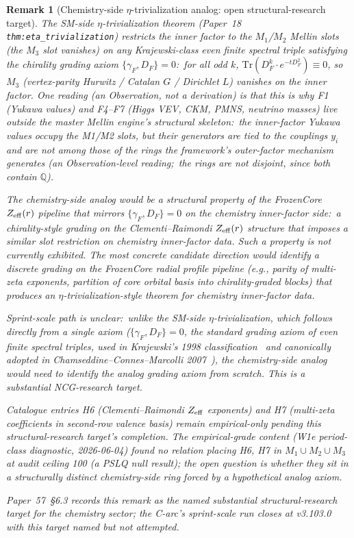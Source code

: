 \documentclass[11pt]{article}
\newtheorem{remark}{Remark}
\begin{document}
\begin{remark}[Chemistry-side $\eta$-trivialization analog: open structural-research target]
\label{rem:chemistry_eta_analog}
The SM-side $\eta$-trivialization theorem (Paper~18 \texttt{thm:eta\_trivialization})
restricts the inner factor to the $M_1$/$M_2$ Mellin \emph{slots} (the
$M_3$ slot vanishes) on any
Krajewski-class even finite spectral triple satisfying the chirality
grading axiom $\{\gamma_F, D_F\} = 0$:\ for all odd $k$, $\mathrm{Tr}(D_F^k
\cdot e^{-tD_F^2}) \equiv 0$, so $M_3$ (vertex-parity Hurwitz / Catalan $G$ /
Dirichlet $L$) vanishes on the inner factor.  One reading (an
Observation, not a derivation) is that this is why F1 (Yukawa values)
and F4--F7 (Higgs VEV, CKM, PMNS, neutrino masses) live outside the master Mellin engine's structural skeleton:\
the inner-factor Yukawa values occupy the M1/M2 slots, but their
generators are tied to the couplings $y_i$ and are not among those of
the rings the framework's outer-factor mechanism generates (an Observation-level
reading;\ the rings are not disjoint, since both contain
$\mathbb{Q}$).

The chemistry-side analog would be a structural property of the
FrozenCore $Z_{\rm eff}(r)$ pipeline that mirrors $\{\gamma_F, D_F\} =
0$ on the chemistry inner-factor side:\ a chirality-style grading on
the Clementi--Raimondi $Z_{\rm eff}(r)$ structure that imposes a
similar slot restriction on chemistry inner-factor data.  Such
a property is not currently exhibited.  The most concrete candidate
direction would identify a discrete grading on the FrozenCore radial
profile pipeline (e.g., parity of multi-zeta exponents, partition of
core orbital basis into chirality-graded blocks) that produces an
$\eta$-trivialization-style theorem for chemistry inner-factor data.

Sprint-scale path is unclear:\ unlike the SM-side
$\eta$-trivialization, which follows directly from a single axiom
($\{\gamma_F, D_F\} = 0$, the standard grading axiom of even finite
spectral triples, used in Krajewski's 1998 classification~\cite{krajewski1998} and
canonically adopted in Chamseddine--Connes--Marcolli 2007~\cite{ccm2007}), the chemistry-side analog would
need to identify the analog grading axiom from scratch.  This is a
substantial NCG-research target.

Catalogue entries H6 (Clementi--Raimondi $Z_{\rm eff}$ exponents) and
H7 (multi-zeta coefficients in second-row valence basis) remain
empirical-only pending this structural-research target's completion.
The empirical-grade content (W1e period-class diagnostic,
2026-06-04)
found no relation placing H6, H7 in $M_1 \cup M_2 \cup M_3$ at audit
ceiling 100 (a PSLQ null result);  the open question is whether they sit in a structurally
distinct chemistry-side ring forced by a hypothetical analog axiom.

Paper~57~\S 6.3 records this remark as the named substantial
structural-research target for the chemistry sector; the C-arc's
sprint-scale run closes at v3.103.0 with this target named but not
attempted.
\end{remark}
\end{document}
